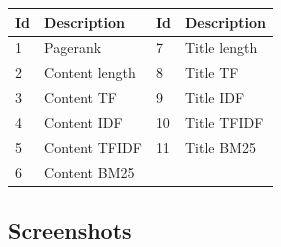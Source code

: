 
\begin{center}
\centering
\label{my-label}
\begin{tabular}{ll|ll}
Id & Description & Id & Description    \\ \hline
1  & Pagerank  & 7  & Title length     \\
2  & Content length & 8  & Title TF  \\
3  & Content TF  & 9  & Title IDF   \\
4  & Content IDF & 10 & Title TFIDF   \\
5  & Content TFIDF & 11 & Title BM25  \\
6  & Content BM25   \\
   
\end{tabular}
  \label{tab:setdescription} 
\end{center}




\subsection{Screenshots} \label{sec:screenshotsec}

